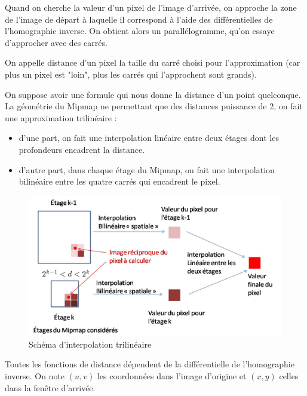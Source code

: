 Quand on cherche la valeur d'un pixel de l'image d'arrivée, on approche la zone de l'image de départ à laquelle il correspond à l'aide des différentielles de l'homographie inverse. On obtient alors un parallélogramme, qu'on essaye d'approcher avec des carrés. %


On appelle distance d'un pixel la taille du carré choisi pour l'approximation (car plus un pixel est "loin", plus les carrés qui l'approchent sont grands). 

On suppose avoir une formule qui nous donne la distance d'un point quelconque. La géométrie du Mipmap ne permettant que des distances puissance de 2, on fait une approximation trilinéaire : 

\begin{itemize}
  \item d'une part, on fait une interpolation linéaire entre deux étages dont les profondeurs encadrent la distance.
  \item d'autre part, dans chaque étage du Mipmap, on fait une interpolation bilinéaire entre les quatre carrés qui encadrent le pixel.
\end{itemize}

\begin{figure}[h!]
\centering
\caption{Schéma d'interpolation trilinéaire}
\includegraphics[scale=0.5]{intertrilineaire.jpg}
\end{figure}


Toutes les fonctions de distance dépendent de la différentielle de l'homographie inverse.
On note $(u,v)$ les coordonnées dans l'image d'origine et $(x,y)$ celles dans la fenêtre d'arrivée.

